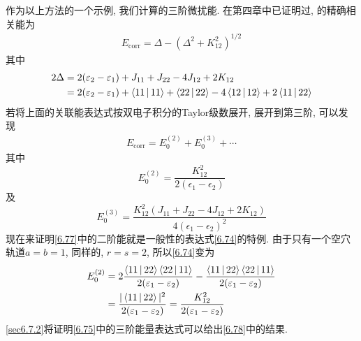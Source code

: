 作为以上方法的一个示例, 
我们计算的三阶微扰能. 
在第四章中已证明过, 
的精确相关能为
\begin{align}
E_\mathrm{corr} = \Delta - (\Delta^2 + K_{12}^2)^{1/2}
\label{6.76}
\end{align}
其中
\begin{align*}
2\Delta & = 2(\varepsilon_2-\varepsilon_1) + J_{11} + J_{22} - 4J_{12} + 2K_{12}\\
        & = 2(\varepsilon_2-\varepsilon_1) + \Braket{11|11} + \Braket{22|22} - 4\Braket{12|12} + 2\Braket{11|22}
\end{align*}
若将上面的关联能表达式按双电子积分的Taylor级数展开, 
展开到第三阶, 
可以发现
\begin{align*}
E_\mathrm{corr}  = E_0^{(2)} + E_0^{(3)} + \cdots
\end{align*}
其中
\begin{equation}
E_0^{(2)} = \frac{K_{12}^2}{2(\epsilon_1-\epsilon_2)}
\label{6.77}
\end{equation}
及
\begin{equation}
E_0^{(3)} = \frac{K_{12}^2(J_{11}+J_{22}-4J_{12}+2K_{12})}{4(\epsilon_1-\epsilon_2)^2}
\label{6.78}
\end{equation}
现在来证明\eqref{6.77}中的二阶能就是一般性的表达式\eqref{6.74}的特例. 
由于只有一个空穴轨道$a=b=1$, 
 同样的, 
$r=s=2$, 
所以\eqref{6.74}变为
\begin{align*}
E_0^{(2)} & = 2\frac{\Braket{11|22}\Braket{22|11}}{2(\varepsilon_1-\varepsilon_2)} - \frac{\Braket{11|22}\Braket{22|11}}{2(\varepsilon_1-\varepsilon_2)} \\
          & = \frac{|\Braket{11|22}|^2}{2(\varepsilon_1-\varepsilon_2)} = \frac{K_{12}^2}{2(\varepsilon_1-\varepsilon_2)}
\end{align*}
\ref{sec6.7.2}将证明\eqref{6.75}中的三阶能量表达式可以给出\eqref{6.78}中的结果.

